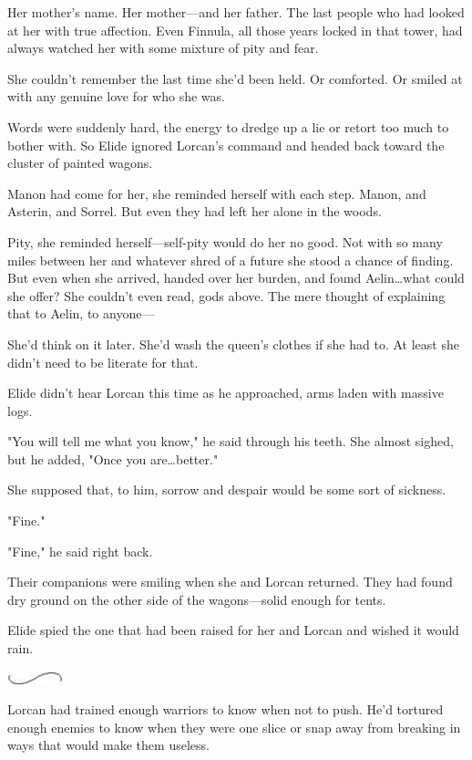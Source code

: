 Her mother's name.
Her mother---and her father.
The last people who had looked at her with true affection.
Even Finnula, all those years locked in that tower, had always watched her with some mixture of pity and fear.

She couldn't remember the last time she'd been held.
Or comforted.
Or smiled at with any genuine love for who she was.

Words were suddenly hard, the energy to dredge up a lie or retort too much to bother with.
So Elide ignored Lorcan's command and headed back toward the cluster of painted wagons.

Manon had come for her, she reminded herself with each step.
Manon, and Asterin, and Sorrel.
But even they had left her alone in the woods.

Pity, she reminded herself---self-pity would do her no good.
Not with so many miles between her and whatever shred of a future she stood a chance of finding.
But even when she arrived, handed over her burden, and found Aelin\ldots what could she offer?
She couldn't even read, gods above.
The mere thought of explaining that to Aelin, to anyone---

She'd think on it later.
She'd wash the queen's clothes if she had to.
At least she didn't need to be literate for that.

Elide didn't hear Lorcan this time as he approached, arms laden with massive logs.

"You will tell me what you know," he said through his teeth.
She almost sighed, but he added, "Once you are\ldots better."

She supposed that, to him, sorrow and despair would be some sort of sickness.

"Fine."

"Fine," he said right back.

Their companions were smiling when she and Lorcan returned.
They had found dry ground on the other side of the wagons---solid enough for tents.

Elide spied the one that had been raised for her and Lorcan and wished it would rain.

\begin{center}
	\includegraphics[width=0.65in,height=0.13in]{images/seperator}
\end{center}

Lorcan had trained enough warriors to know when not to push.
He'd tortured enough enemies to know when they were one slice or snap away from breaking in ways that would make them useless.

